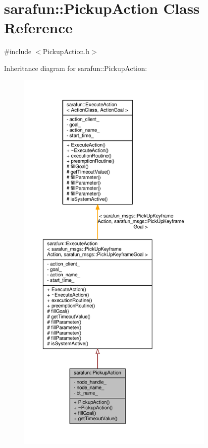\hypertarget{classsarafun_1_1PickupAction}{\section{sarafun\-:\-:Pickup\-Action Class Reference}
\label{classsarafun_1_1PickupAction}
}


{\ttfamily \#include $<$Pickup\-Action.\-h$>$}



Inheritance diagram for sarafun\-:\-:Pickup\-Action\-:\nopagebreak
\begin{figure}[H]
\begin{center}
\leavevmode
\includegraphics[height=550pt]{db/de1/classsarafun_1_1PickupAction__inherit__graph}
\end{center}
\end{figure}


